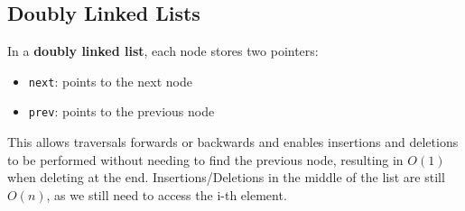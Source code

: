 \subsection{Doubly Linked Lists}
In a \textbf{doubly linked list}, each node stores two pointers:
\begin{itemize}
  \item \texttt{next}: points to the next node
  \item \texttt{prev}: points to the previous node
\end{itemize}

This allows traversals forwards or backwards and enables insertions and deletions to be performed without needing to find the previous node, resulting in $O(1)$ when deleting at the end. Insertions/Deletions in the middle of the list are still $O(n)$, as we still need to access the i-th element.